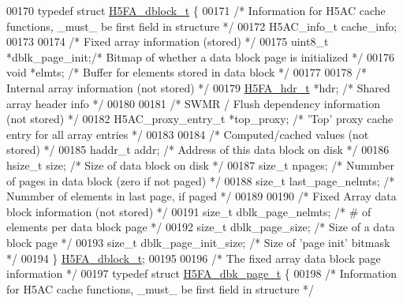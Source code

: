 \begin{DoxyCode}
00170 \textcolor{keyword}{typedef} \textcolor{keyword}{struct }\hyperlink{struct_h5_f_a__dblock__t}{H5FA\_dblock\_t} \{
00171     \textcolor{comment}{/* Information for H5AC cache functions, \_must\_ be first field in structure */}
00172     H5AC\_info\_t cache\_info;
00173 
00174     \textcolor{comment}{/* Fixed array information (stored) */}
00175     uint8\_t     *dblk\_page\_init;\textcolor{comment}{/* Bitmap of whether a data block page is initialized       */}
00176     \textcolor{keywordtype}{void}        *elmts;         \textcolor{comment}{/* Buffer for elements stored in data block                 */}
00177 
00178     \textcolor{comment}{/* Internal array information (not stored) */}
00179     \hyperlink{struct_h5_f_a__hdr__t}{H5FA\_hdr\_t}    *hdr;            \textcolor{comment}{/* Shared array header info                              */}
00180 
00181     \textcolor{comment}{/* SWMR / Flush dependency information (not stored) */}
00182     H5AC\_proxy\_entry\_t *top\_proxy;      \textcolor{comment}{/* 'Top' proxy cache entry for all array entries */}
00183 
00184     \textcolor{comment}{/* Computed/cached values (not stored) */}
00185     haddr\_t     addr;               \textcolor{comment}{/* Address of this data block on disk                   */}
00186     hsize\_t     size;               \textcolor{comment}{/* Size of data block on disk                           */}
00187     \textcolor{keywordtype}{size\_t}      npages;             \textcolor{comment}{/* Nummber of pages in data block (zero if not paged)   */}
00188     \textcolor{keywordtype}{size\_t}      last\_page\_nelmts;   \textcolor{comment}{/* Nummber of elements in last page, if paged           */}
00189 
00190     \textcolor{comment}{/* Fixed Array data block information (not stored) */}
00191     \textcolor{keywordtype}{size\_t} dblk\_page\_nelmts;        \textcolor{comment}{/* # of elements per data block page                    */}
00192     \textcolor{keywordtype}{size\_t} dblk\_page\_size;          \textcolor{comment}{/* Size of a data block page                            */}
00193     \textcolor{keywordtype}{size\_t} dblk\_page\_init\_size;     \textcolor{comment}{/* Size of 'page init' bitmask                          */}
00194 \} \hyperlink{struct_h5_f_a__dblock__t}{H5FA\_dblock\_t};
00195 
00196 \textcolor{comment}{/* The fixed array data block page information */}
00197 \textcolor{keyword}{typedef} \textcolor{keyword}{struct }\hyperlink{struct_h5_f_a__dbk__page__t}{H5FA\_dbk\_page\_t} \{
00198     \textcolor{comment}{/* Information for H5AC cache functions, \_must\_ be first field in structure */}

\end{DoxyCode}
